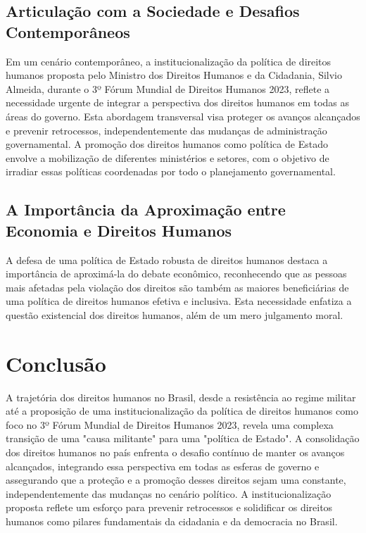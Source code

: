 \documentclass[
   article,       
   12pt,          
   oneside,       
   a4paper,       
   english,       
   brazil,        
   sumario=tradicional
   ]{abntex2}
\begin{document}
\subsection{Articulação com a Sociedade e Desafios Contemporâneos}

Em um cenário contemporâneo, a institucionalização da política de direitos humanos proposta pelo Ministro dos Direitos Humanos e da Cidadania, Silvio Almeida, durante o 3º Fórum Mundial de Direitos Humanos 2023, reflete a necessidade urgente de integrar a perspectiva dos direitos humanos em todas as áreas do governo. Esta abordagem transversal visa proteger os avanços alcançados e prevenir retrocessos, independentemente das mudanças de administração governamental. A promoção dos direitos humanos como política de Estado envolve a mobilização de diferentes ministérios e setores, com o objetivo de irradiar essas políticas coordenadas por todo o planejamento governamental.

\subsection{A Importância da Aproximação entre Economia e Direitos Humanos}

A defesa de uma política de Estado robusta de direitos humanos destaca a importância de aproximá-la do debate econômico, reconhecendo que as pessoas mais afetadas pela violação dos direitos são também as maiores beneficiárias de uma política de direitos humanos efetiva e inclusiva. Esta necessidade enfatiza a questão existencial dos direitos humanos, além de um mero julgamento moral.

\section{Conclusão}

A trajetória dos direitos humanos no Brasil, desde a resistência ao regime militar até a proposição de uma institucionalização da política de direitos humanos como foco no 3º Fórum Mundial de Direitos Humanos 2023, revela uma complexa transição de uma "causa militante" para uma "política de Estado". A consolidação dos direitos humanos no país enfrenta o desafio contínuo de manter os avanços alcançados, integrando essa perspectiva em todas as esferas de governo e assegurando que a proteção e a promoção desses direitos sejam uma constante, independentemente das mudanças no cenário político. A institucionalização proposta reflete um esforço para prevenir retrocessos e solidificar os direitos humanos como pilares fundamentais da cidadania e da democracia no Brasil.
\end{document}
